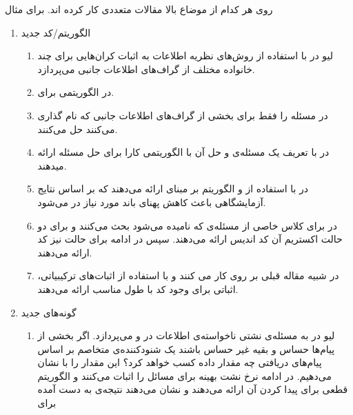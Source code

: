  روی هر کدام از موضاع بالا مقالات متعددی کار کرده اند. برای مثال
 \begin{enumerate}
 	\item الگوریتم‌/کد جدید
 	\begin{enumerate}
 		\item 
 		لیو در
 		\cite{8278015}
 		با استفاده از روش‌های نظریه اطلاعات به اثبات کران‌هایی برای چند خانواده مختلف از گراف‌های اطلاعات جانبی می‌پردازد.
 		\item 
 		در
 		\cite{10313405}
 		الگوریتمی برای.
 		\item
 		در
 		\cite{8871209}
 		مسئله را فقط برای بخشی از گراف‌های اطلاعات جانبی که
 		نام گذاری می‌کنند حل می‌کنند.
 		\item
 		در
 		\cite{9759449}
 		با تعریف یک مسئله‌ی
 		و حل آن با 
 		الگوریتمی کارا برای حل مسئله ارائه میدهند.
 		\item
 		در
 		\cite{8682270}
 		با استفاده از
 		\picod
 		و الگوریتم بر مبنای
 		ارائه می‌دهند که بر اساس نتایج آزمایشگاهی باعث کاهش پهنای باند مورد نیاز در
 		می‌شود.
 		\item
 		در
 		\cite{sasi2019pliable}
 		برای کلاس خاصی از مسئله‌ی
 		\picod
 		که
 		نامیده می‌شود بحث می‌کنند و برای دو حالت اکستریم آن کد اندیس ارائه می‌دهند. سپس در ادامه برای حالت
 		نیز کد ارائه می‌دهند.
 		\item 
 		در
 		\cite{8613483}
 		شبیه مقاله قبلی بر روی
 		کار می کنند و با استفاده از اثبات‌های ترکیبیاتی، اثباتی برای وجود کد با طول مناسب ارائه می‌دهند.
 	\end{enumerate}
 	\item گونه‌های جدید
 	\begin{enumerate}
 		\item
 		لیو در
 		\cite{10015670}
 		به مسئله‌ی نشتی ناخواسته‌ی اطلاعات
 		 در 
 		\icod
 		و
 		\picod
 		می‌پردازد. اگر بخشی از پیام‌ها حساس و بقیه غیر حساس باشند یک شنودکننده‌ی متخاصم بر اساس پیام‌های دریافتی چه مقدار داده کسب خواهد کرد؟ این مقدار را با
 		نشان می‌دهیم. در ادامه نرخ نشت بهینه برای مسائل
 		\icod
 		را اثبات می‌کنند و الگوریتم قطعی برای پیدا کردن آن ارائه می‌دهند و نشان می‌دهند نتیجه‌ی به دست آمده برای

\end{enumerate}
\end{enumerate}
